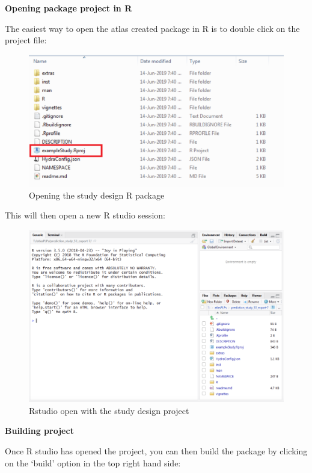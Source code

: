 \documentclass[11pt]{book}
\begin{document}
\textbf{Opening package project in R}

The easiest way to open the atlas created package in R is to double
click on the project file:

\begin{figure}
\includegraphics[width=1\linewidth]{images/PatientLevelPrediction/atlasImplementation/download_folder_project} \caption{Opening the study design R package}\label{fig:figureU11}
\end{figure}

This will then open a new R studio session:

\begin{figure}
\includegraphics[width=1\linewidth]{images/PatientLevelPrediction/atlasImplementation/rstudio_start} \caption{Rstudio open with the study design project}\label{fig:figureU12}
\end{figure}

\textbf{Building project}

Once R studio has opened the project, you can then build the package by
clicking on the `build' option in the top right hand side:
\end{document}
